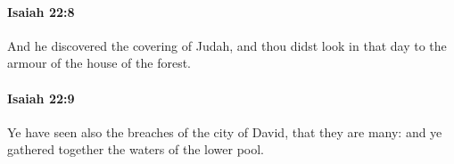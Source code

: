 		\paragraph{Isaiah 22:8} %
			\label{ISAIAH-22-8}

			And he discovered the covering of Judah, and thou didst look in that day to the armour of the house of the forest.


		\paragraph{Isaiah 22:9} %
			\label{ISAIAH-22-9}

			Ye have seen also the breaches of the city of David, that they are many: and ye gathered together the waters of the lower pool.


